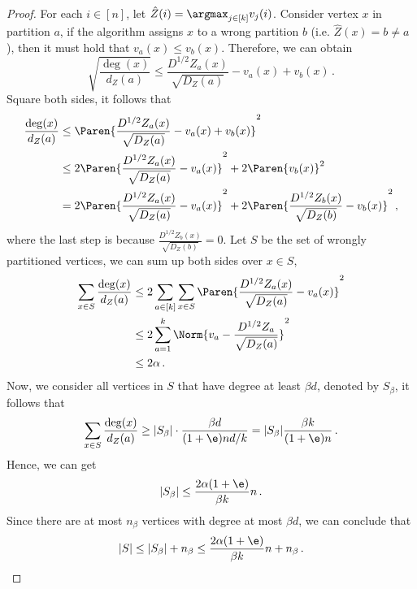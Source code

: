 \begin{proof}
    For each $i \in [n]$, let $\hat{Z}(i) = \argmax_{j \in [k]} v_{j}(i)$. Consider vertex $x$ in partition $a$, if the algorithm assigns $x$ to a wrong partition $b$ (i.e. $\hat{Z}(x) = b \neq a$), then it must hold that $v_a(x) \leq v_b(x)$. Therefore, we can obtain
    \begin{equation*}
        \sqrt{\frac{\deg(x)}{d_Z(a)}} \leq \frac{D^{1/2} Z_a(x)}{\sqrt{D_Z(a)}} - v_a(x) + v_b(x) \,.
    \end{equation*}
    Square both sides, it follows that
    \begin{align*}
        \frac{\deg(x)}{d_Z(a)}
        & \leq \Paren{\frac{D^{1/2} Z_a(x)}{\sqrt{D_Z(a)}} - v_a(x) + v_b(x)}^2 \\
        & \leq 2 \Paren{\frac{D^{1/2} Z_a(x)}{\sqrt{D_Z(a)}} - v_a(x)}^2 + 2 \Paren{v_b(x)}^2 \\
        & = 2 \Paren{\frac{D^{1/2} Z_a(x)}{\sqrt{D_Z(a)}} - v_a(x)}^2 + 2 \Paren{\frac{D^{1/2} Z_b(x)}{\sqrt{D_Z(b)}} - v_b(x)}^2 \,,
    \end{align*}
    where the last step is because $\frac{D^{1/2} Z_b(x)}{\sqrt{D_Z(b)}}=0$. Let $S$ be the set of wrongly partitioned vertices, we can sum up both sides over $x \in S$,
    \begin{align*}
        \sum_{x \in S} \frac{\deg(x)}{d_Z(a)}
        & \leq 2 \sum_{a \in [k]} \sum_{x \in S} \Paren{\frac{D^{1/2} Z_a(x)}{\sqrt{D_Z(a)}} - v_a(x)}^2 \\
        & \leq 2 \sum_{a=1}^k \Norm{v_a - \frac{D^{1/2} Z_a}{\sqrt{D_Z(a)}}}^2 \\
        & \leq 2 \alpha \,.
    \end{align*}
    Now, we consider all vertices in $S$ that have degree at least $\beta d$, denoted by $S_\beta$, it follows that
    \begin{equation*}
        \sum_{x \in S} \frac{\deg(x)}{d_Z(a)}
        \geq |S_{\beta}| \cdot \frac{\beta d}{(1+\e) nd / k}
        = |S_{\beta}| \frac{\beta k}{(1+\e) n} \,.
    \end{equation*}
    Hence, we can get
    \begin{equation*}
        |S_{\beta}| \leq \frac{2 \alpha (1+\e)}{\beta k} n \,.
    \end{equation*}
    Since there are at most $n_{\beta}$ vertices with degree at most $\beta d$, we can conclude that
    \begin{equation*}
        |S| \leq |S_{\beta}| + n_{\beta} \leq \frac{2 \alpha (1+\e)}{\beta k} n + n_{\beta} \,.
    \end{equation*}
\end{proof}

